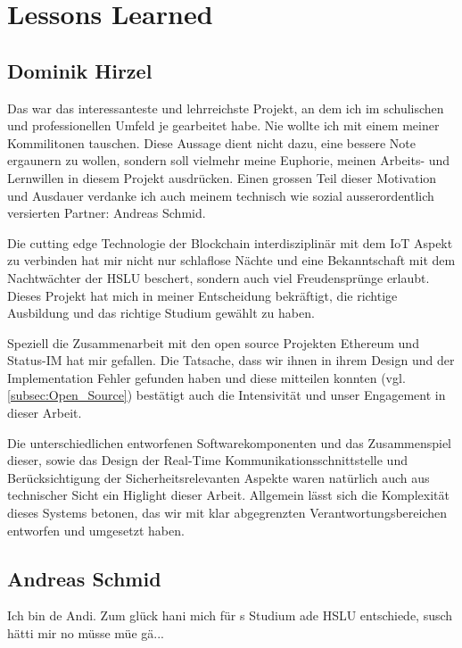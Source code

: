 \section{Lessons Learned}
\label{sec:Lessons_Learned}

\subsection{Dominik Hirzel}
Das war das interessanteste und lehrreichste Projekt, an dem ich im schulischen und professionellen Umfeld je gearbeitet habe. Nie wollte ich mit einem meiner Kommilitonen tauschen. Diese Aussage dient nicht dazu, eine bessere Note ergaunern zu wollen, sondern soll vielmehr meine Euphorie, meinen Arbeits- und Lernwillen in diesem Projekt ausdrücken. Einen grossen Teil dieser Motivation und Ausdauer verdanke ich auch meinem technisch wie sozial ausserordentlich versierten Partner: Andreas Schmid.

Die cutting edge Technologie der Blockchain interdisziplinär mit dem IoT Aspekt zu verbinden hat mir nicht nur schlaflose Nächte und eine Bekanntschaft mit dem Nachtwächter der HSLU beschert, sondern auch viel Freudensprünge erlaubt. Dieses Projekt hat mich in meiner Entscheidung bekräftigt, die richtige Ausbildung und das richtige Studium gewählt zu haben.

Speziell die Zusammenarbeit mit den open source Projekten Ethereum und Status-IM hat mir gefallen. Die Tatsache, dass wir ihnen in ihrem Design und der Implementation Fehler gefunden haben und diese mitteilen konnten (vgl. \ref{subsec:Open_Source}) bestätigt auch die Intensivität und unser Engagement in dieser Arbeit.

Die unterschiedlichen entworfenen Softwarekomponenten und das Zusammenspiel dieser, sowie das Design der Real-Time Kommunikationsschnittstelle und Berücksichtigung der Sicherheitsrelevanten Aspekte waren natürlich auch aus technischer Sicht ein Higlight dieser Arbeit. Allgemein lässt sich die Komplexität dieses Systems betonen, das wir mit klar abgegrenzten Verantwortungsbereichen entworfen und umgesetzt haben.

\subsection{Andreas Schmid}
Ich bin de Andi. Zum glück hani mich für s Studium ade HSLU entschiede, susch hätti mir no müsse müe gä...
